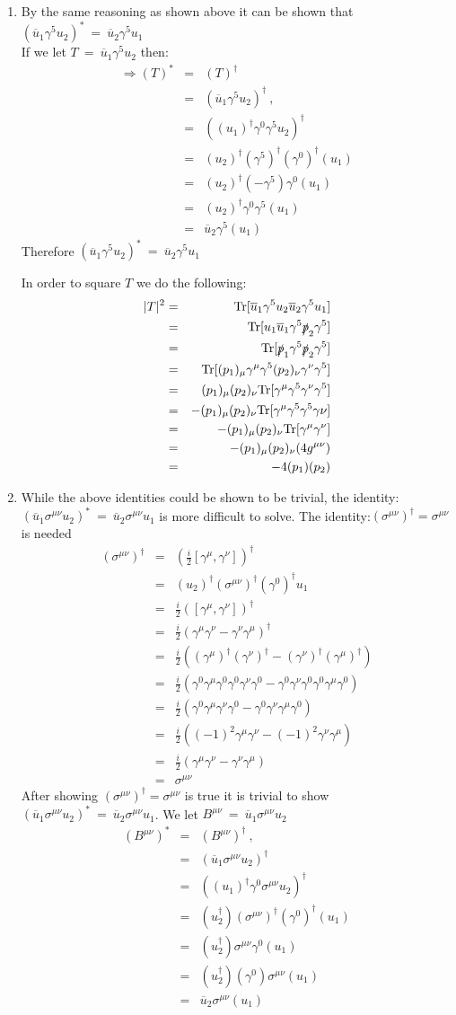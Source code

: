\documentclass[12pt]{article}
\def \bea{\begin{eqnarray}}
\def \eea{\end{eqnarray}}
\def \Tr{{\rm Tr}}
\def \nn{\nonumber}
\def \nl{\nn \\}
\def \ou{\overline{u}}
\def \ga{\gamma}
\def \si{\sigma}
\begin{document}
\begin{enumerate}
\item By the same reasoning as shown above it can be shown that $(\ou_1 \ga^5 u_2)^* ~=~ \ou_2 \ga^5 u_1$ \\
If we let $T ~=~ \ou_1\ga^5 u_2$ then:
\bea
\Rightarrow (T)^* &=& (T)^\dag  \\\
&=& (\ou_1\ga^5 u_2)^\dag ~,~~ \nl
&=& ((u_1)^\dag\ga^0\ga^5 u_2)^\dag \nl
&=& (u_2)^\dag(\ga^5)^\dag (\ga^0)^\dag(u_1)\nl
&=& (u_2)^\dag(-\ga^5) \ga^0(u_1)\nl
&=& (u_2)^\dag \ga^0\ga^5(u_1)\nl
&=& \ou_2\ga^5(u_1)
\eea
Therefore  $(\ou_1 \ga^5 u_2)^* ~=~ \ou_2 \ga^5 u_1$

In order to square $T$ we do the following:
\bea
|T|^2&=& \Tr[\ou_1 \ga^5 u_2\ou_2 \ga^5 u_1] \\
&=& \Tr[u_1 \ou_1 \ga^5 \slashed{p}_2 \ga^5] \nl
&=& \Tr[\slashed{p}_1 \ga^5 \slashed{p}_2 \ga^5] \nl
&=& \Tr[(p_1)_\mu \ga^\mu \ga^5 (p_2)_\nu \ga^\nu \ga^5] \nl
&=& (p_1)_\mu(p_2)_\nu \Tr[\ga^\mu\ga^5\ga^\nu\ga^5] \nl
&=& -(p_1)_\mu(p_2)_\nu \Tr[\ga^\mu\ga^5\ga^5\ga\nu]\nl
&=& -(p_1)_\mu(p_2)_\nu \Tr[\ga^\mu\ga^\nu]\nl
&=& -(p_1)_\mu(p_2)_\nu (4g^{\mu\nu})\nl
&=& -4(p_1)(p_2) \nl
\eea

\item While the above identities could be shown to be trivial, the identity: $(\ou_1 \si^{\mu\nu} u_2)^* ~=~\ou_2 \si^{\mu\nu} u_1$ is more difficult to solve. The identity:$(\si^{\mu\nu})^\dag =\si^{\mu\nu}$ is needed
\bea
(\si^{\mu\nu})^\dag &=& (\frac{i}{2}[\ga^\mu,\ga^\nu])^\dag \\
&=&(u_2)^\dag (\si^{\mu\nu})^\dag (\ga^0)^\dag u_1 \nl
&=& \frac{i}{2}([\ga^\mu,\ga^\nu])^\dag\nl
&=& \frac{i}{2}(\ga^\mu\ga^\nu-\ga^\nu\ga^\mu)^\dag \nl
&=& \frac{i}{2}((\ga^\mu)^\dag(\ga^\nu)^\dag-(\ga^\nu)^\dag(\ga^\mu)^\dag) \nl
&=& \frac{i}{2}(\ga^0\ga^\mu\ga^0\ga^0\ga^\nu\ga^0-\ga^0\ga^\nu\ga^0\ga^0\ga^\mu\ga^0)\nl
&=& \frac{i}{2}(\ga^0\ga^\mu\ga^\nu\ga^0-\ga^0\ga^\nu \ga^\mu\ga^0)\nl
&=& \frac{i}{2}((-1)^2\ga^\mu\ga^\nu-(-1)^2\ga^\nu \ga^\mu) \nl
&=& \frac{i}{2}(\ga^\mu\ga^\nu-\ga^\nu \ga^\mu)\nl
&=& \si^{\mu\nu}
\eea
After showing $(\si^{\mu\nu})^\dag =\si^{\mu\nu}$ is true it is trivial to show $(\ou_1 \si^{\mu\nu} u_2)^* ~=~\ou_2 \si^{\mu\nu} u_1$.
We let $B^{\mu\nu} ~=~ \ou_1 \si^{\mu\nu} u_2$
\bea
(B^{\mu\nu})^* &=& (B^{\mu\nu})^\dag ~,~~ \\
&=& (\ou_1 \si^{\mu\nu} u_2)^\dag \nl
&=& ((u_1)^\dag \ga^0 \si^{\mu\nu} u_2)^\dag \nl
&=& (u_2^\dag)(\si^{\mu\nu})^\dag (\ga^0)^\dag(u_1)\nl
&=& (u_2^\dag)\si^{\mu\nu}\ga^0(u_1)\nl
&=& (u_2^\dag)(\ga^0)\si^{\mu\nu}(u_1)\nl
&=& \ou_2 \si^{\mu\nu}(u_1)
\eea


\end{enumerate}
\end{document}
